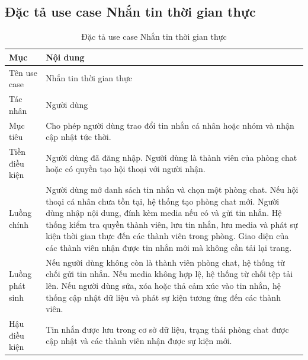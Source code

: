 \documentclass[../DoAn.tex]{subfiles}
\begin{document}
\subsection{Đặc tả use case Nhắn tin thời gian thực}
\label{subsection:2.3.5}
\begin{table}[H]
\centering
\caption{Đặc tả use case Nhắn tin thời gian thực}
\label{table:uc-chat}
\begin{tabular}{|p{3.5cm}|p{9.5cm}|}
\hline
\textbf{Mục} & \textbf{Nội dung} \\
\hline
Tên use case & Nhắn tin thời gian thực \\
\hline
Tác nhân & Người dùng \\
\hline
Mục tiêu & Cho phép người dùng trao đổi tin nhắn cá nhân hoặc nhóm và nhận cập nhật tức thời. \\
\hline
Tiền điều kiện & Người dùng đã đăng nhập. Người dùng là thành viên của phòng chat hoặc có quyền tạo hội thoại với người nhận. \\
\hline
Luồng chính & Người dùng mở danh sách tin nhắn và chọn một phòng chat. Nếu hội thoại cá nhân chưa tồn tại, hệ thống tạo phòng chat mới. Người dùng nhập nội dung, đính kèm media nếu có và gửi tin nhắn. Hệ thống kiểm tra quyền thành viên, lưu tin nhắn, lưu media và phát sự kiện thời gian thực đến các thành viên trong phòng. Giao diện của các thành viên nhận được tin nhắn mới mà không cần tải lại trang. \\
\hline
Luồng phát sinh & Nếu người dùng không còn là thành viên phòng chat, hệ thống từ chối gửi tin nhắn. Nếu media không hợp lệ, hệ thống từ chối tệp tải lên. Nếu người dùng sửa, xóa hoặc thả cảm xúc vào tin nhắn, hệ thống cập nhật dữ liệu và phát sự kiện tương ứng đến các thành viên. \\
\hline
Hậu điều kiện & Tin nhắn được lưu trong cơ sở dữ liệu, trạng thái phòng chat được cập nhật và các thành viên nhận được sự kiện mới. \\
\hline
\end{tabular}
\end{table}
\end{document}
